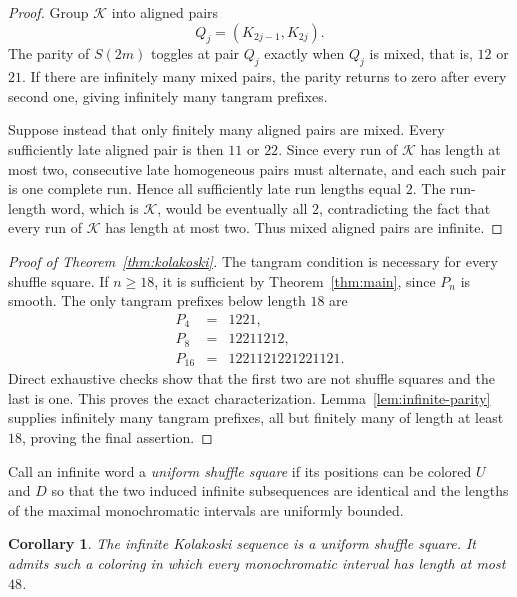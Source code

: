 \documentclass[11pt]{article}
\newtheorem{corollary}[theorem]{Corollary}
\theoremstyle{definition}
\theoremstyle{remark}
\newcommand{\K}{\mathcal K}
\begin{document}
\begin{proof}
Group $\K$ into aligned pairs
\[
 Q_j=(K_{2j-1},K_{2j}).
\]
The parity of $S(2m)$ toggles at pair $Q_j$ exactly when $Q_j$ is mixed,
that is, $12$ or $21$.  If there are infinitely many mixed pairs, the
parity returns to zero after every second one, giving infinitely many
tangram prefixes.

Suppose instead that only finitely many aligned pairs are mixed.  Every
sufficiently late aligned pair is then $11$ or $22$.  Since every run of
$\K$ has length at most two, consecutive late homogeneous pairs must
alternate, and each such pair is one complete run.  Hence all
sufficiently late run lengths equal $2$.  The run-length word, which is
$\K$, would be eventually all $2$, contradicting the fact that every run
of $\K$ has length at most two.  Thus mixed aligned pairs are infinite.
\end{proof}

\begin{proof}[Proof of Theorem~\ref{thm:kolakoski}]
The tangram condition is necessary for every shuffle square.  If
$n\ge18$, it is sufficient by Theorem~\ref{thm:main}, since $P_n$ is
smooth.  The only tangram prefixes below length $18$ are
\[
\begin{array}{ccl}
P_4&=&1221,\\
P_8&=&12211212,\\
P_{16}&=&1221121221221121.
\end{array}
\]
Direct exhaustive checks show that the first two are not shuffle
squares and the last is one.  This proves the exact characterization.
Lemma~\ref{lem:infinite-parity} supplies infinitely many tangram
prefixes, all but finitely many of length at least $18$, proving the
final assertion.
\end{proof}

Call an infinite word a \emph{uniform shuffle square} if its positions
can be colored $U$ and $D$ so that the two induced infinite
subsequences are identical and the lengths of the maximal
monochromatic intervals are uniformly bounded.

\begin{corollary}\label{cor:uniform}
The infinite Kolakoski sequence is a uniform shuffle square.  It admits
such a coloring in which every monochromatic interval has length at
most $48$.
\end{corollary}
\end{document}
